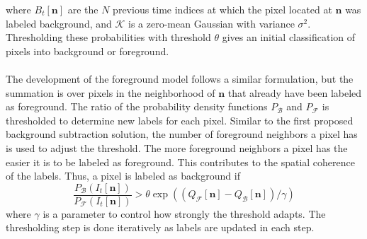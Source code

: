 \documentclass[12pt,oneside]{article} %
\begin{document}
where 
$B_t[\mathbf{n}]$ are the $N$ previous time indices at which the pixel located at $\mathbf{n}$ was labeled
background, and $\mathcal{K}$ is a zero-mean Gaussian with variance $\sigma^2$. Thresholding these probabilities
with threshold $\theta$ gives an initial classification of pixels into background or foreground.
\\ \\
The development of the foreground model follows a similar formulation, but the summation is over
pixels in the neighborhood of $\mathbf{n}$ that already have been labeled as foreground. The
ratio of the probability density functions $P_\mathcal{B}$ and 
$P_\mathcal{F}$ is thresholded to determine new labels for each pixel. 
Similar to the first proposed background subtraction solution,
the number of foreground neighbors a pixel has is used to adjust the threshold. 
The more foreground
neighbors a pixel has the easier it is to be labeled as foreground. This contributes to the spatial
coherence of the labels. Thus, a pixel is labeled as background if
$$\frac{P_\mathcal{B}(I_t[\mathbf{n}])}{P_\mathcal{F}(I_t[\mathbf{n}])} > \theta \exp \left(
	(Q_\mathcal{F}[\mathbf{n}] - Q_\mathcal{B}[\mathbf{n}] ) / \gamma\right)$$
where $\gamma$ is a parameter to control how strongly the threshold
adapts. The thresholding step is done iteratively as labels are updated in each step.
\end{document}
